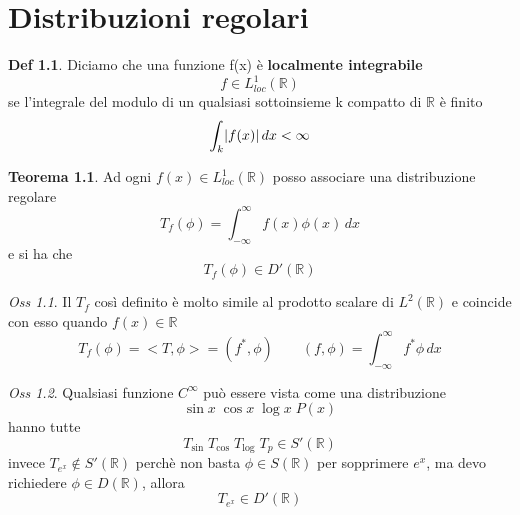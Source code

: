 \documentclass[a4paper,11pt]{report}
\theoremstyle{remark}
\newtheorem*{oss}{Oss}
\theoremstyle{definition}
\newtheorem*{teo}{Teorema}
\newtheorem*{Def}{Def}
\newcommand{\R}{\mathbb{R}}
\DeclarePairedDelimiter{\abs}{\lvert}{\rvert}
\begin{document}
\chapter{Distribuzioni regolari}

\begin{Def}
	Diciamo che una funzione f(x) è \textbf{localmente integrabile} 
	\begin{equation*}
		f \in L^1_{loc}(\R) 
	\end{equation*}
	se l'integrale del modulo di un qualsiasi sottoinsieme k compatto di $\R$ è finito
	\begin{equation*}
		\int_k \abs{f(x)}\, dx < \infty
	\end{equation*}
\end{Def}

\begin{teo}
	Ad ogni $f(x) \in L^1_{loc}(\R)$ posso associare una distribuzione regolare
	\begin{equation*}
		T_f(\phi) = \int_{-\infty}^\infty f(x)\phi(x) \, dx
	\end{equation*}
	e si ha che 
	\begin{equation*}
		T_f(\phi)\in D'(\R)
	\end{equation*}
\end{teo}

\begin{oss}
	Il $T_f$ così definito è molto simile al prodotto scalare di $L^2(\R)$ e coincide con esso quando $f(x)\in \R$
	\begin{equation*}
		T_f(\phi) = <T,\phi> = (f^*,\phi) \qquad (f,\phi) = \int_{-\infty}^\infty f^* \phi \, dx 
	\end{equation*}
\end{oss}

\begin{oss}
	Qualsiasi funzione $C^\infty$ può essere vista come una distribuzione
	\begin{equation*}
		\sin{x} \; \cos{x} \; \log{x} \; P(x)
	\end{equation*}
	hanno tutte
	\begin{equation*}
		T_{\sin{}} \; T_{\cos{}} \; T_{\log{}} \; T_p \in S'(\R)
	\end{equation*}
	invece $T_{e^x}\not\in S'(\R)$ perchè non basta $\phi\in S(\R)$ per sopprimere $e^x$, ma devo richiedere $\phi\in D(\R)$, allora
	\begin{equation*}
		T_{e^x} \in D'(\R)
	\end{equation*}
\end{oss}
\end{document}
